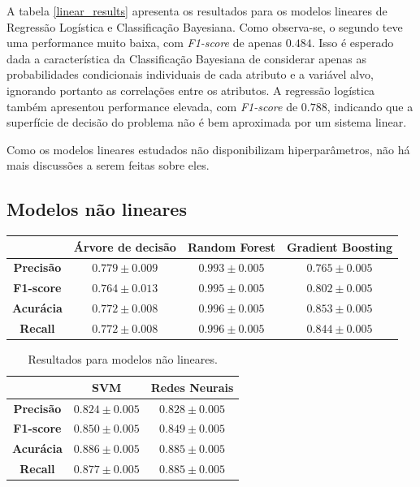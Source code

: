 \documentclass{homework}
\begin{document}
A tabela \ref{linear_results} apresenta os resultados para os modelos lineares de Regressão Logística e Classificação
Bayesiana. Como observa-se, o segundo teve uma performance muito baixa, com \textit{F1-score} de apenas $0.484$.
Isso é esperado dada a característica da Classificação Bayesiana de considerar apenas as probabilidades condicionais
individuais de cada atributo e a variável alvo, ignorando portanto as correlações entre os atributos. A regressão
logística também apresentou performance elevada, com \textit{F1-score} de $0.788$, indicando que a superfície de decisão
do problema não é bem aproximada por um sistema linear.

Como os modelos lineares estudados não disponibilizam hiperparâmetros, não há mais discussões a serem feitas sobre eles.

\subsection{Modelos não lineares}

\begin{table}[h!]
    \centering
    \begin{tabular}{|c|c|c|c|}
        \hline
            & \textbf{Árvore de decisão} & \textbf{Random Forest} & \textbf{Gradient Boosting} \\
        \hline
        \textbf{Precisão} & $0.779 \pm 0.009$ & $0.993 \pm 0.005$ & $0.765 \pm 0.005$ \\
        \hline
        \textbf{F1-score} & $0.764 \pm 0.013$ & $0.995 \pm 0.005$ & $0.802 \pm 0.005$ \\
        \hline
        \textbf{Acurácia} & $0.772 \pm 0.008$ & $0.996 \pm 0.005$ & $0.853 \pm 0.005$ \\
        \hline
        \textbf{Recall} & $0.772 \pm 0.008$ & $0.996 \pm 0.005$ & $0.844 \pm 0.005$ \\
        \hline
    \end{tabular}
\end{table}
\begin{table}[h!]
\centering
    \begin{tabular}{|c|c|c|}
        \hline
            & \textbf{SVM} & \textbf{Redes Neurais} \\
        \hline
        \textbf{Precisão} & $0.824 \pm 0.005$ & $0.828 \pm 0.005$ \\
        \hline
        \textbf{F1-score} & $0.850 \pm 0.005$ & $0.849 \pm 0.005$ \\
        \hline
        \textbf{Acurácia} & $0.886 \pm 0.005$ & $0.885 \pm 0.005$ \\
        \hline
        \textbf{Recall} & $0.877 \pm 0.005$ & $0.885 \pm 0.005$ \\
        \hline
    \end{tabular}
    \caption{Resultados para modelos não lineares.}
    \label{non_linear_results}
\end{table}
\end{document}
